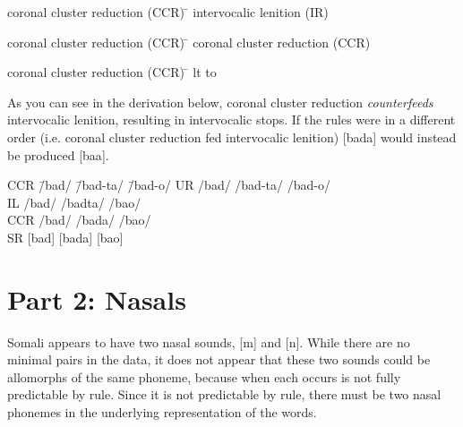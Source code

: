 \documentclass[doc,12pt]{apa6}
\begin{document}
\begin{exe}

	\ex \begin{tabbing}
		coronal cluster reduction (CCR) \= \kill
		intervocalic lenition (IR) \>
		\end{tabbing}

	\ex \begin{tabbing}
		coronal cluster reduction (CCR) \= \kill
		coronal cluster reduction (CCR) \>
		\phonl{\phonfeat{+cor\\-son}}{
		       $\emptyset$}{
		       \phonfeat{+cor\\-son}}
		\end{tabbing}

	\ex \begin{tabbing}
		coronal cluster reduction (CCR) \= \kill
		lt to \textipa{S} \>
		\phon{lt}{\textipa{S}}
	\end{tabbing}

\end{exe}

As you can see in the derivation below, coronal cluster reduction
\emph{counterfeeds} intervocalic lenition, resulting in intervocalic stops.
If the rules were in a different order (i.e. coronal cluster reduction fed
intervocalic lenition) {[}bada{]} would instead be produced
{[}baa{]}.

\begin{exe}
	\ex \begin{tabbing}
		CCR \hspace{2em} \= /bad/ \hspace{2em}
		\= /bad-ta/ \hspace{2em} \= /bad-o/ \kill
		UR  \> /bad/ \> /bad-ta/ \> /bad-o/          \\
		IL  \> /bad/ \> /badta/  \> /bao/ \\
		CCR \> /bad/ \> /bada/   \> /bao/ \\
		SR  \> {[}bad{]} \> {[}bada{]} \> {[}ba\textipa{D}o{]}
		\end{tabbing}
\end{exe}

\section{Part 2: Nasals}

Somali appears to have two nasal sounds, {[}m{]} and {[}n{]}. While there are
no minimal pairs in the data, it does not appear that these two sounds could be
allomorphs of the same phoneme, because when each occurs is not fully
predictable by rule. Since it is not predictable by rule, there must be two 
nasal phonemes in the underlying representation of the words.
\end{document}
